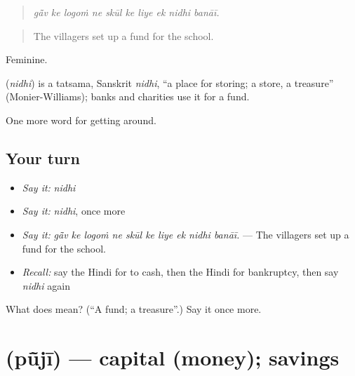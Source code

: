 \begin{quote}
         
\end{quote}

\begin{quote}
\emph{gā̃v ke logoṁ ne skūl ke liye ek nidhi banāī.}
\end{quote}

\begin{quote}
The villagers set up a fund for the school.
\end{quote}

Feminine.

\begin{cousinweb}
\textbf{} (\emph{nidhi}) is a tatsama, Sanskrit \emph{nidhi}, \textquotedblleft{}a place for storing; a store, a treasure\textquotedblright{} (Monier-Williams); banks and charities use it for a fund.
\end{cousinweb}

\begin{grammarlens}[title={What you've built}]
One more word for getting around.
\end{grammarlens}

\subsection*{Your turn}
\begin{itemize}
\raggedright
  \item \emph{Say it:} \emph{nidhi}
  \item \emph{Say it:} \emph{nidhi}, once more
  \item \emph{Say it:} \emph{gā̃v ke logoṁ ne skūl ke liye ek nidhi banāī.} — The villagers set up a fund for the school.
  \item \emph{Recall:} say the Hindi for to cash, then the Hindi for bankruptcy, then say \emph{nidhi} again
\end{itemize}

\begin{tcolorbox}[breakable,colback=teal!4,colframe=teal!35!black,title={Before you move on}]
What does  mean? (\textquotedblleft{}A fund; a treasure\textquotedblright{}.) Say it once more.
\end{tcolorbox}
\section[\texorpdfstring{\hi{पूँजी} (pū̃jī)}{पूँजी (pū̃jī)}]{ (pū̃jī) — capital (money); savings}

